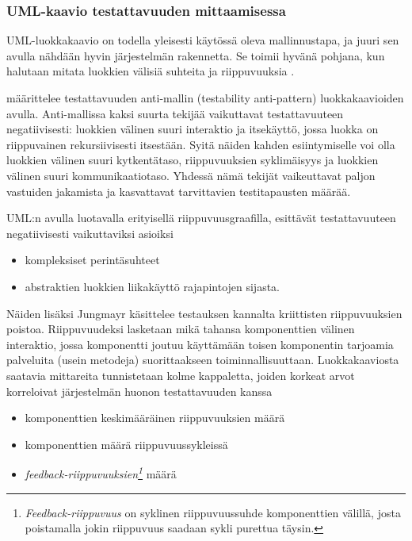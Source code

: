 \documentclass[finnish]{tktltiki2}
\theoremstyle{definition}
\theoremstyle{remark}
\begin{document}
\subsubsection{UML-kaavio testattavuuden mittaamisessa}

UML-luokkakaavio on todella yleisesti käytössä oleva mallinnustapa, ja juuri sen avulla nähdään hyvin järjestelmän rakennetta. Se toimii hyvänä pohjana, kun halutaan mitata luokkien välisiä suhteita ja riippuvuuksia \citep{baudry_testability_2002}. 

\citep{baudry_measuring_2003} määrittelee testattavuuden anti-mallin (testability anti-pattern) luokkakaavioiden avulla. Anti-mallissa kaksi suurta tekijää vaikuttavat testattavuuteen negatiivisesti: luokkien välinen suuri interaktio ja itsekäyttö, jossa luokka on riippuvainen rekursiivisesti itsestään. Syitä näiden kahden esiintymiselle voi olla luokkien välinen suuri kytkentätaso, riippuvuuksien syklimäisyys ja luokkien välinen suuri kommunikaatiotaso. Yhdessä nämä tekijät vaikeuttavat paljon vastuiden jakamista ja kasvattavat tarvittavien testitapausten määrää. 


UML:n avulla luotavalla erityisellä riippuvuusgraafilla, esittävät testattavuuteen negatiivisesti vaikuttaviksi asioiksi \citep{baudry_testability_2002}

\begin{itemize} 
	\item kompleksiset perintäsuhteet
	\item abstraktien luokkien liikakäyttö rajapintojen sijasta.
\end{itemize}


Näiden lisäksi Jungmayr \citep{Jungmayr:2002} käsittelee testauksen kannalta kriittisten riippuvuuksien poistoa. Riippuvuudeksi lasketaan mikä tahansa komponenttien välinen interaktio, jossa komponentti joutuu käyttämään toisen komponentin tarjoamia palveluita (usein metodeja) suorittaakseen toiminnallisuuttaan.  Luokkakaaviosta saatavia mittareita tunnistetaan kolme kappaletta, joiden korkeat arvot korreloivat järjestelmän huonon testattavuuden kanssa 

\begin{itemize}
	\item komponenttien keskimääräinen riippuvuuksien määrä
	\item komponenttien määrä riippuvuussykleissä
	\item \textit{feedback-riippuvuuksien\footnote{\textit{Feedback-riippuvuus} on syklinen riippuvuussuhde komponenttien välillä, josta poistamalla jokin riippuvuus saadaan sykli purettua täysin.}}  määrä 
\end{itemize}
\end{document}
